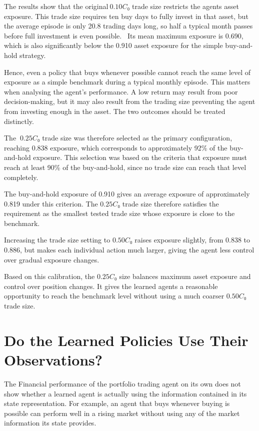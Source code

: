 The results show that the original\(\ 0.10C₀\) trade size restricts the
agent\textquotesingle s asset exposure. This trade size requires ten buy
days to fully invest in that asset, but the average episode is only 20.8
trading days long, so half a typical month passes before full investment
is even possible.~ Its mean maximum exposure is 0.690, which is also
significantly below the 0.910 asset exposure for the simple buy-and-hold
strategy.

Hence, even a policy that buys whenever possible cannot reach the same
level of exposure as a simple benchmark during a typical monthly
episode. This matters when analysing the agent's performance. A low
return may result from poor decision-making, but it may also result from
the trading size preventing the agent from investing enough in the
asset. The two outcomes should be treated distinctly.

The \(\ 0.25C₀\) trade size was therefore selected as the primary
configuration, reaching 0.838 exposure, which corresponds to
approximately 92\% of the buy-and-hold exposure. This selection was
based on the criteria that exposure must reach at least 90\% of the
buy-and-hold, since no trade size can reach that level completely.

The buy-and-hold exposure of 0.910 gives an average exposure of
approximately 0.819 under this criterion. The \(0.25C₀\) trade size
therefore satisfies the requirement as the smallest tested trade size
whose exposure is close to the benchmark.

Increasing the trade size setting to \(0.50C₀\) raises exposure
slightly, from 0.838 to 0.886, but makes each individual action much
larger, giving the agent less control over gradual exposure changes.

Based on this calibration, the \(0.25C₀\) size balances maximum asset
exposure and control over position changes. It gives the learned agents
a reasonable opportunity to reach the benchmark level without using a
much coarser \(0.50C₀\) trade size.

\section{Do the Learned Policies Use Their Observations?}

The Financial performance of the portfolio trading agent on its own does
not show whether a learned agent is actually using the information
contained in its state representation. For example, an agent that buys
whenever buying is possible can perform well in a rising market without
using any of the market information its state provides.

